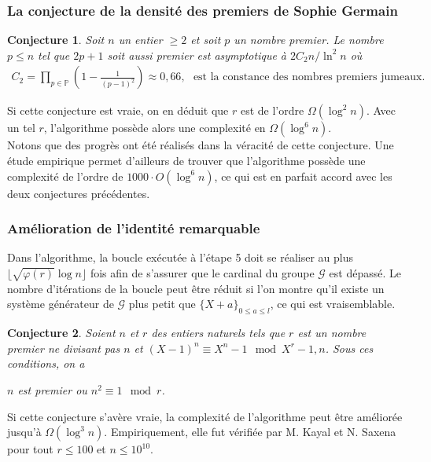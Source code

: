 \documentclass[11pt]{article}
\newtheorem{conject}{Conjecture}[subsection]
\begin{document}
\subsubsection{La conjecture de la densité des premiers de Sophie Germain}

\begin{conject}
Soit $n$ un entier $\geqslant 2$ et soit $p$ un nombre premier. Le nombre $p \leqslant n$ tel que $2p+1$ soit aussi premier est asymptotique à $2C_2n/\ln^2n$ où
\begin{align*}
C_2=\prod_{p \in \mathbb{P}}^{} (1-\frac{1}{(p-1)^2}) \approx 0,66,\ \ \ \text{est la constance des nombres premiers jumeaux.}
\end{align*}
\end{conject}

Si cette conjecture est vraie, on en déduit que $r$ est de l'ordre $\Omega(\log^2 n)$. Avec un tel $r$, l'algorithme possède alors une complexité en $\Omega(\log^6 n)$.\\

Notons que des progrès ont été réalisés dans la véracité de cette conjecture. Une étude empirique permet d'ailleurs de trouver que l'algorithme possède une complexité de l'ordre de $1000 \cdot O(\log^6 n)$, ce qui est en parfait accord avec les deux conjectures précédentes.

\subsubsection{Amélioration de l'identité remarquable}

Dans l'algorithme, la boucle exécutée à l'étape 5 doit se réaliser au plus $\lfloor \sqrt{\varphi(r)} \log n \rfloor$ fois afin de s'assurer que le cardinal du groupe $\mathcal{G}$ est dépassé. Le nombre d'itérations de la boucle peut être réduit si l'on montre qu'il existe un système générateur de $\mathcal{G}$ plus petit que $\{X+a\}_{0 \leqslant a \leqslant l}$, ce qui est vraisemblable.

\begin{conject}
Soient $n$ et $r$ des entiers naturels tels que $r$ est un nombre premier ne divisant pas $n$ et $(X-1)^n \equiv X^n-1 \mod X^r-1,n$. Sous ces conditions, on a
\begin{center}
$n$ est premier ou $n^2 \equiv 1 \mod r$.
\end{center}
\end{conject}

Si cette conjecture s'avère vraie, la complexité de l'algorithme peut être améliorée jusqu'à $\Omega(\log^3 n)$. Empiriquement, elle fut vérifiée par M. Kayal et N. Saxena pour tout $r \leqslant 100$ et $n \leqslant 10^{10}$.\\
\end{document}
